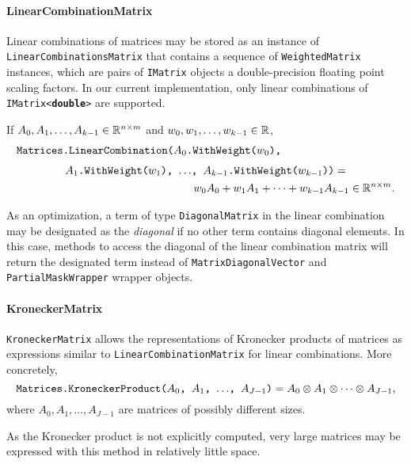\paragraph{LinearCombinationMatrix}

Linear combinations of matrices may be stored as an instance of
\texttt{LinearCombinationsMatrix} that contains a sequence of
\texttt{WeightedMatrix} instances, which are pairs of \texttt{IMatrix}
objects a double-precision floating point scaling factors. In our
current implementation, only linear combinations of
\texttt{IMatrix<\textbf{double}>} are supported.

If $A_0, A_1, \ldots, A_{k - 1} \in \mathbb{R}^{n \times m}$ and $w_0, w_1,
\ldots, w_{k - 1} \in \mathbb{R}$,
\begin{equation}
  \begin{multlined}[12cm]
    \texttt{Matrices.LinearCombination($A_0$.WithWeight($w_0$),} \\[1ex]
    \texttt{$A_1$.WithWeight($w_1$), $\ldots$, $A_{k - 1}$.WithWeight($w_{k -
      1}$))} = \\
  w_0 A_0 + w_1 A_1 + \cdots + w_{k - 1} A_{k - 1} \in \RR^{n \times
    m} \text.
  \end{multlined}
\end{equation}

As an optimization, a term of type \texttt{DiagonalMatrix} in the
linear combination may be designated as the \emph{diagonal} if no
other term contains diagonal elements. In this case, methods to access
the diagonal of the linear combination matrix will return the
designated term instead of \texttt{MatrixDiagonalVector} and
\texttt{PartialMaskWrapper} wrapper objects.

\paragraph{KroneckerMatrix}

\texttt{KroneckerMatrix} allows the representations of Kronecker
products of matrices as expressions similar to
\texttt{LinearCombinationMatrix} for linear combinations.
More concretely,
\begin{equation}
  \texttt{Matrices.KroneckerProduct($A_0$, $A_1$, $\ldots$, $A_{J -
      1}$)} = A_0 \otimes A_1 \otimes \cdots \otimes A_{J - 1}
  \text,
\end{equation}
where $A_0, A_1, \ldots, A_{J - 1}$ are matrices of possibly different
sizes.

As the Kronecker product is not explicitly computed, very large
matrices may be expressed with this method in relatively little space.

